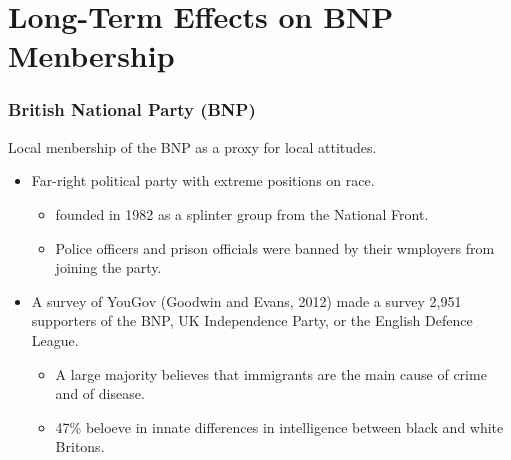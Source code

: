 \documentclass[dvipdfmx,11pt]{beamer}
\begin{document}
\section{Long-Term Effects on BNP Menbership}
\frame{\sectionpage}
\begin{frame}\frametitle{British National Party (BNP)}
  Local menbership of the BNP as a proxy for local attitudes.
  \begin{itemize}
    \item Far-right political party with extreme positions on race.
    \begin{itemize}
      \item founded in 1982 as a splinter group from the National Front.
      \item Police officers and prison officials were banned by their wmployers from joining the party.
    \end{itemize}
    \item A survey of YouGov (Goodwin and Evans, 2012) made a survey 2,951 supporters of the BNP, UK Independence Party, or the English Defence League.
    \begin{itemize}
      \item A large majority believes that immigrants are the main cause of crime and of disease.
      \item 47\% beloeve in innate differences in intelligence between black and white Britons.
    \end{itemize}
  \end{itemize}
\end{frame}
\end{document}
